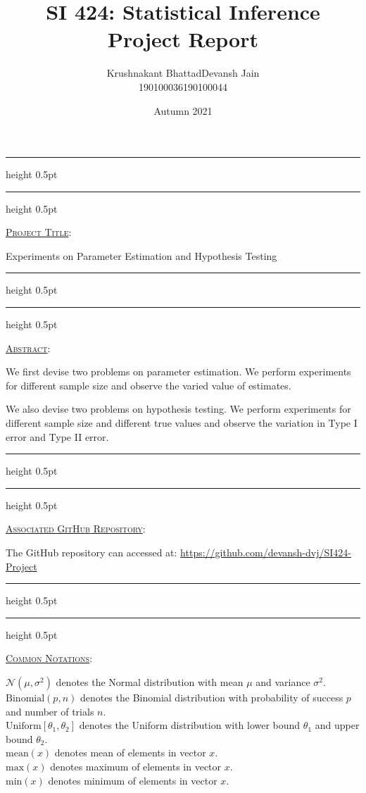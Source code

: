 \documentclass[fleqn, 11pt]{article}
\title{SI 424: Statistical Inference \\ Project Report}
\author{
    \begin{tabular}{|c|c|}
        \hline
        \textsf{Krushnakant Bhattad} & \textsf{ \hspace{5pt} Devansh Jain \hspace{5pt} } \\
        \hline
        \textsf{190100036} & \textsf{190100044}\\
        \hline
    \end{tabular}
}
\date{Autumn 2021}
\newcommand{\myline}{
    \par
    \kern3pt %
    \hrule height 0.5pt
    \kern2pt %
    \hrule height 0.5pt
    \kern3pt %
    \par
}
\renewcommand{\arraystretch}{2}
\begin{document}
\maketitle
\thispagestyle{empty}
\renewcommand{\arraystretch}{1}%
\setcounter{page}{0}

\myline
\vspace{10pt}
\underline{\large {\textsc{Project Title}}}:

\medskip

Experiments on Parameter Estimation and Hypothesis Testing

\vspace{7pt}
\myline
\vspace{10pt}
\underline{\large {\textsc{Abstract}}}:

\medskip

We first devise two problems on parameter estimation. We perform experiments for different sample size and observe the varied value of estimates.

We also devise two problems on hypothesis testing. We perform experiments for different sample size and different true values and observe the variation in Type I error and Type II error.

\vspace{7pt}
\myline
\vspace{10pt}
\underline{\large {\textsc{Associated GitHub Repository}}}:

\medskip

The GitHub repository can accessed at: \url{https://github.com/devansh-dvj/SI424-Project}

\vspace{7pt}
\myline
\vspace{10pt}
\underline{\large {\textsc{Common Notations}}}:

\medskip

$\mathcal{N}(\mu, \sigma^2)$ denotes the Normal distribution with mean $\mu$ and variance $\sigma^2$. \\
$\mathrm{Binomial}(p, n)$ denotes the Binomial distribution with probability of success $p$ and number of trials $n$. \\
$\mathrm{Uniform}[\theta_1, \theta_2]$ denotes the Uniform distribution with lower bound $\theta_1$ and upper bound $\theta_2$. \\
$\mathrm{mean}(x)$ denotes mean of elements in vector $x$. \\
$\mathrm{max}(x)$ denotes maximum of elements in vector $x$. \\
$\mathrm{min}(x)$ denotes minimum of elements in vector $x$.
\end{document}

